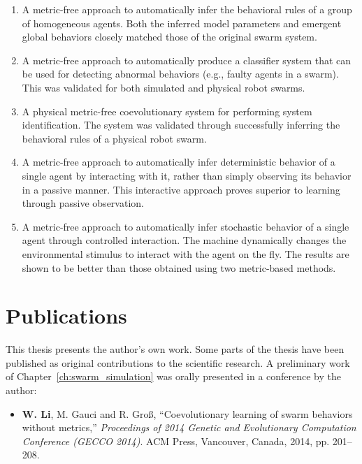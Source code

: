 \begin{enumerate}[1)]

\item A metric-free approach to automatically infer the behavioral rules of a group of homogeneous agents. Both the inferred model parameters and emergent global behaviors closely matched those of the original swarm system. 

\item A metric-free approach to automatically produce a classifier system that can be used for detecting abnormal behaviors (e.g., faulty agents in a swarm). This was validated for both simulated and physical robot swarms.

\item A physical metric-free coevolutionary system for performing system identification. The system was validated through successfully inferring the behavioral rules of a physical robot swarm. 

\item A metric-free approach to automatically infer deterministic behavior of a single agent by interacting with it, rather than simply observing its behavior in a passive manner. This interactive approach proves superior to learning through passive observation. 

\item A metric-free approach to automatically infer stochastic behavior of a single agent through controlled interaction. The machine dynamically changes the environmental stimulus to interact with the agent on the fly. The results are shown to be better than those obtained using two metric-based methods.  

\end{enumerate}

\section{Publications}

This thesis presents the author's own work. Some parts of the thesis have been published as original contributions to the scientific research. A preliminary work of Chapter~\ref{ch:swarm_simulation} was orally presented in a conference by the author:
\begin{itemize}
%
\item \textbf{W. Li}, M. Gauci and R. Gro{\ss}, ``Coevolutionary learning of swarm behaviors without metrics,'' \textit{Proceedings of 2014 Genetic and Evolutionary Computation Conference (GECCO 2014)}. ACM Press, Vancouver, Canada, 2014, pp. 201--208.
%
\end{itemize}

